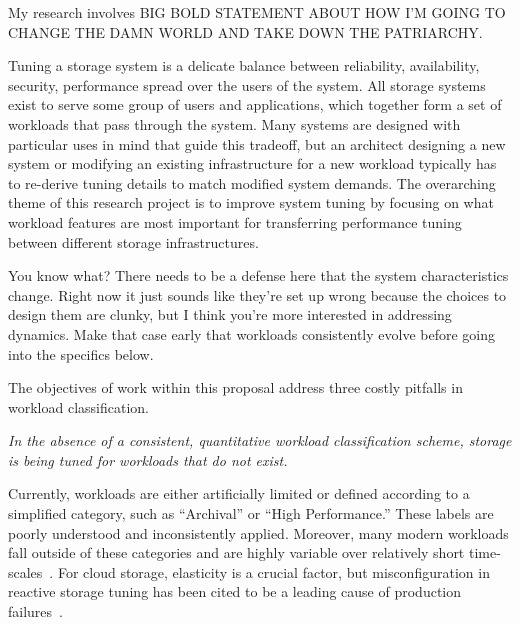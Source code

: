 My research involves BIG BOLD STATEMENT ABOUT HOW I'M GOING TO CHANGE THE DAMN WORLD AND TAKE DOWN THE PATRIARCHY.


Tuning a storage system is a delicate
balance between reliability, availability, security, performance spread over the
users of the system. %
All storage systems exist to serve some group of users and applications, which together form a set of
workloads that pass through the system. Many systems are designed with particular uses in mind that guide this tradeoff, but an architect designing a new system or modifying an existing
infrastructure for a new workload typically has to re-derive tuning details to match modified system demands. The overarching theme of this research project is to improve system tuning by
focusing on what workload features are most important for transferring
performance tuning between different storage infrastructures.

You know what? There needs to be a defense here that the system characteristics change.  Right now it just sounds like they're set up wrong because the choices to design them are clunky, but I think you're more interested in addressing dynamics.  Make that case early that workloads consistently evolve before going into the specifics below.


The objectives of work within this proposal address three costly pitfalls in workload classification.

\textit{In the absence of a consistent, quantitative workload classification scheme, storage is being tuned for workloads that do not exist.}

Currently, workloads are either artificially limited or defined
according to a simplified category, such as ``Archival'' or ``High
Performance.'' These labels are poorly understood and inconsistently applied.
Moreover, many modern workloads fall outside of these categories and are highly variable over relatively short time-scales~\cite{google_dist_store_2015}.  For cloud storage, elasticity is a crucial factor, but misconfiguration in reactive storage tuning has been cited to be a leading cause of production failures~\cite{yin2011empirical}.  



